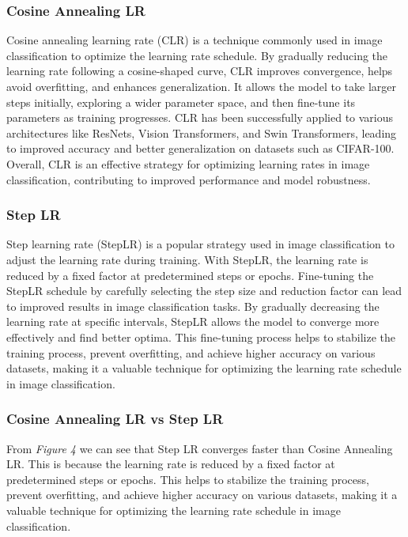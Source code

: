 \documentclass{article}
\begin{document}
\subsubsection{Cosine Annealing LR}
Cosine annealing learning rate (CLR) is a technique commonly used in image classification to optimize the learning rate schedule.
By gradually reducing the learning rate following a cosine-shaped curve, CLR improves convergence, helps avoid overfitting, and enhances generalization.
It allows the model to take larger steps initially, exploring a wider parameter space, and then fine-tune its parameters as training progresses.
CLR has been successfully applied to various architectures like ResNets, Vision Transformers, and Swin Transformers, leading to improved accuracy and better generalization on datasets such as CIFAR-100.
Overall, CLR is an effective strategy for optimizing learning rates in image classification, contributing to improved performance and model robustness.


\subsubsection{Step LR}
Step learning rate (StepLR) is a popular strategy used in image classification to adjust the learning rate during training.
With StepLR, the learning rate is reduced by a fixed factor at predetermined steps or epochs.
Fine-tuning the StepLR schedule by carefully selecting the step size and reduction factor can lead to improved results in image classification tasks.
By gradually decreasing the learning rate at specific intervals, StepLR allows the model to converge more effectively and find better optima.
This fine-tuning process helps to stabilize the training process, prevent overfitting, and achieve higher accuracy on various datasets, making it a valuable technique for optimizing the learning rate schedule in image classification.

\subsubsection{Cosine Annealing LR vs Step LR}
From \textit{Figure 4} we can see that Step LR converges faster than Cosine Annealing LR.
This is because the learning rate is reduced by a fixed factor at predetermined steps or epochs.
This helps to stabilize the training process, prevent overfitting, and achieve higher accuracy on various datasets, making it a valuable technique for optimizing the learning rate schedule in image classification.
\end{document}

